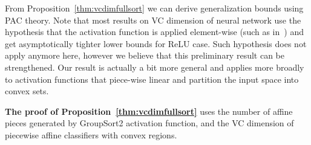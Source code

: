            \vcdimfullsort*
            
            From Proposition~\ref{thm:vcdimfullsort} we can derive generalization bounds using PAC theory. Note that most results on VC dimension of neural network use the hypothesis that the activation function is applied element-wise (such as in~\cite{bartlett2019nearly}) and get asymptotically tighter lower bounds for ReLU case. Such hypothesis does not apply anymore here, however we believe that this preliminary result can be strengthened. Our result is actually a bit more general and applies more broadly to activation functions that piece-wise linear and partition the input space into convex sets.  
              
            \textbf{The proof of Proposition~\ref{thm:vcdimfullsort}} uses the number of affine pieces generated by GroupSort2 activation function, and the VC dimension of piecewise affine classifiers with convex regions.  
              
